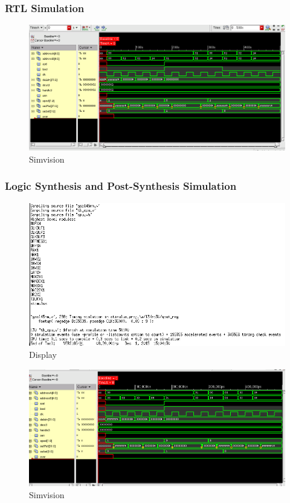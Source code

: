 \documentclass[12pt]{article}
\begin{document}
\subsubsection{RTL Simulation}
\begin{figure}[H]
\centering
\includegraphics[width=\linewidth]{../CLA/CLA-test}
\caption{Simvision}
\label{fig:CLA-test}
\end{figure}

\subsubsection{Logic Synthesis and Post-Synthesis Simulation}
\begin{figure}[H]
\centering
\includegraphics[width=.7\linewidth]{../CLA/synth-text}
\caption{Display}
\label{fig:synth-text}
\end{figure}

\begin{figure}[H]
\centering
\includegraphics[width=\linewidth]{../CLA/synth-test}
\caption{Simvision}
\label{fig:synth-test}
\end{figure}
\end{document}
